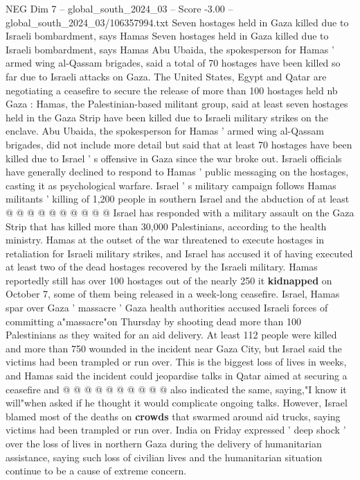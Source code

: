 \begin{textsample}{NEG Dim 7 – global\_south\_2024\_03 – Score -3.00 – global\_south\_2024\_03/106357994.txt}  \label{ex:f7_neg_430}
Seven hostages held in Gaza killed due to Israeli bombardment, says Hamas Seven hostages held in Gaza killed due to Israeli bombardment, says Hamas Abu Ubaida, the spokesperson for Hamas ' armed wing al-Qassam brigades, said a total of 70 hostages have been killed so far due to Israeli attacks on Gaza.
The United States, Egypt and Qatar are negotiating a ceasefire to secure the release of more than 100 hostages held nb Gaza : Hamas, the Palestinian-based militant group, said at least seven hostages held in the Gaza Strip have been killed due to Israeli military strikes on the enclave.
Abu Ubaida, the spokesperson for Hamas ' armed wing al-Qassam brigades, did not include more detail but said that at least 70 hostages have been killed due to Israel ' s offensive in Gaza since the war broke out.
Israeli officials have generally declined to respond to Hamas ' public messaging on the hostages, casting it as psychological warfare.
Israel ' s military campaign follows Hamas militants ' killing of 1,200 people in southern Israel and the abduction of at least @ @ @ @ @ @ @ @ @ @ Israel has responded with a military assault on the Gaza Strip that has killed more than 30,000 Palestinians, according to the health ministry.
Hamas at the outset of the war threatened to execute hostages in retaliation for Israeli military strikes, and Israel has accused it of having executed at least two of the dead hostages recovered by the Israeli military.
Hamas reportedly still has over 100 hostages out of the nearly 250 it \textbf{kidnapped} on October 7, some of them being released in a week-long ceasefire.
Israel, Hamas spar over Gaza ' massacre ' Gaza health authorities accused Israeli forces of committing a"massacre"on Thursday by shooting dead more than 100 Palestinians as they waited for an aid delivery.
At least 112 people were killed and more than 750 wounded in the incident near Gaza City, but Israel said the victims had been trampled or run over.
This is the biggest loss of lives in weeks, and Hamas said the incident could jeopardise talks in Qatar aimed at securing a ceasefire and @ @ @ @ @ @ @ @ @ @ also indicated the same, saying,"I know it will"when asked if he thought it would complicate ongoing talks.
However, Israel blamed most of the deaths on \textbf{crowds} that swarmed around aid trucks, saying victims had been trampled or run over.
India on Friday expressed ' deep shock ' over the loss of lives in northern Gaza during the delivery of humanitarian assistance, saying such loss of civilian lives and the humanitarian situation continue to be a cause of extreme concern.

\end{textsample}
